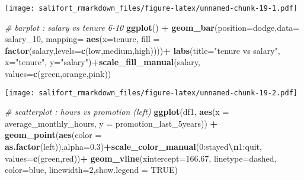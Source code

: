 \documentclass[
]{article}
\newenvironment{Shaded}{\begin{snugshade}}{\end{snugshade}}
\newcommand{\AttributeTok}[1]{\textcolor[rgb]{0.13,0.29,0.53}{#1}}
\newcommand{\CommentTok}[1]{\textcolor[rgb]{0.56,0.35,0.01}{\textit{#1}}}
\newcommand{\ConstantTok}[1]{\textcolor[rgb]{0.56,0.35,0.01}{#1}}
\newcommand{\DecValTok}[1]{\textcolor[rgb]{0.00,0.00,0.81}{#1}}
\newcommand{\FloatTok}[1]{\textcolor[rgb]{0.00,0.00,0.81}{#1}}
\newcommand{\FunctionTok}[1]{\textcolor[rgb]{0.13,0.29,0.53}{\textbf{#1}}}
\newcommand{\NormalTok}[1]{#1}
\newcommand{\SpecialCharTok}[1]{\textcolor[rgb]{0.81,0.36,0.00}{\textbf{#1}}}
\newcommand{\StringTok}[1]{\textcolor[rgb]{0.31,0.60,0.02}{#1}}
\begin{document}
\texttt{[image: salifort\_rmarkdown\_files/figure-latex/unnamed-chunk-19-1.pdf]}

\begin{Shaded}
\begin{Highlighting}[]
\CommentTok{\# barplot : salary vs tenure 6{-}10}
\FunctionTok{ggplot}\NormalTok{() }\SpecialCharTok{+} \FunctionTok{geom\_bar}\NormalTok{(}\AttributeTok{position=}\StringTok{\textquotesingle{}dodge\textquotesingle{}}\NormalTok{,}\AttributeTok{data=}\NormalTok{ salary\_10, }\AttributeTok{mapping=} \FunctionTok{aes}\NormalTok{(}\AttributeTok{x=}\NormalTok{tenure, }\AttributeTok{fill =} \FunctionTok{factor}\NormalTok{(salary,}\AttributeTok{levels=}\FunctionTok{c}\NormalTok{(}\StringTok{\textquotesingle{}low\textquotesingle{}}\NormalTok{,}\StringTok{\textquotesingle{}medium\textquotesingle{}}\NormalTok{,}\StringTok{\textquotesingle{}high\textquotesingle{}}\NormalTok{))))}\SpecialCharTok{+}
  \FunctionTok{labs}\NormalTok{(}\AttributeTok{title=}\StringTok{"tenure vs salary"}\NormalTok{, }\AttributeTok{x=}\StringTok{"tenure"}\NormalTok{, }\AttributeTok{y=}\StringTok{"salary"}\NormalTok{)}\SpecialCharTok{+}\FunctionTok{scale\_fill\_manual}\NormalTok{(}\StringTok{\textquotesingle{}salary\textquotesingle{}}\NormalTok{, }\AttributeTok{values=}\FunctionTok{c}\NormalTok{(}\StringTok{\textquotesingle{}green\textquotesingle{}}\NormalTok{,}\StringTok{\textquotesingle{}orange\textquotesingle{}}\NormalTok{,}\StringTok{\textquotesingle{}pink\textquotesingle{}}\NormalTok{))}
\end{Highlighting}
\end{Shaded}

\texttt{[image: salifort\_rmarkdown\_files/figure-latex/unnamed-chunk-19-2.pdf]}

\begin{Shaded}
\begin{Highlighting}[]
\CommentTok{\# scatterplot : hours vs promotion (left)}
\FunctionTok{ggplot}\NormalTok{(df1, }\FunctionTok{aes}\NormalTok{(}\AttributeTok{x =}\NormalTok{ average\_monthly\_hours, }\AttributeTok{y =}\NormalTok{ promotion\_last\_5years)) }\SpecialCharTok{+}
  \FunctionTok{geom\_point}\NormalTok{(}\FunctionTok{aes}\NormalTok{(}\AttributeTok{color =} \FunctionTok{as.factor}\NormalTok{(left)),}\AttributeTok{alpha=}\FloatTok{0.3}\NormalTok{)}\SpecialCharTok{+}\FunctionTok{scale\_color\_manual}\NormalTok{(}\StringTok{\textquotesingle{}0:stayed}\SpecialCharTok{\textbackslash{}n}\StringTok{1:quit\textquotesingle{}}\NormalTok{, }\AttributeTok{values=}\FunctionTok{c}\NormalTok{(}\StringTok{\textquotesingle{}green\textquotesingle{}}\NormalTok{,}\StringTok{\textquotesingle{}red\textquotesingle{}}\NormalTok{))}\SpecialCharTok{+}
  \FunctionTok{geom\_vline}\NormalTok{(}\AttributeTok{xintercept=}\FloatTok{166.67}\NormalTok{, }\AttributeTok{linetype=}\StringTok{\textquotesingle{}dashed\textquotesingle{}}\NormalTok{, }\AttributeTok{color=}\StringTok{\textquotesingle{}blue\textquotesingle{}}\NormalTok{, }\AttributeTok{linewidth=}\DecValTok{2}\NormalTok{,}\AttributeTok{show.legend =} \ConstantTok{TRUE}\NormalTok{)}
\end{Highlighting}
\end{Shaded}
\end{document}
